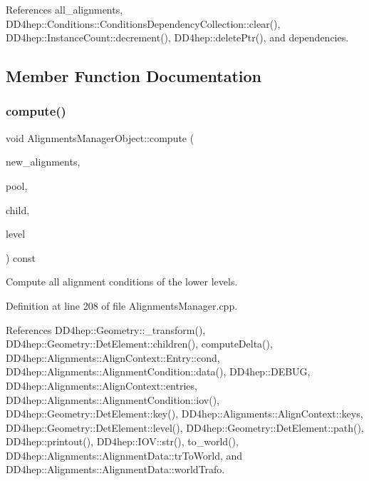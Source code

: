 References all\+\_\+alignments, D\+D4hep\+::\+Conditions\+::\+Conditions\+Dependency\+Collection\+::clear(), D\+D4hep\+::\+Instance\+Count\+::decrement(), D\+D4hep\+::delete\+Ptr(), and dependencies.



\subsection{Member Function Documentation}
\hypertarget{class_d_d4hep_1_1_alignments_1_1_alignments_manager_object_a91c9cba53d1965f76ab51b1449863225}{}\label{class_d_d4hep_1_1_alignments_1_1_alignments_manager_object_a91c9cba53d1965f76ab51b1449863225} 
\subsubsection{\texorpdfstring{compute()}{compute()}\hspace{0.1cm}{\footnotesize\ttfamily [1/3]}}
{\footnotesize\ttfamily void Alignments\+Manager\+Object\+::compute (\begin{DoxyParamCaption}\item[{\hyperlink{class_d_d4hep_1_1_alignments_1_1_align_context}{Align\+Context} \&}]{new\+\_\+alignments,  }\item[{\hyperlink{class_d_d4hep_1_1_conditions_1_1_user_pool}{User\+Pool} \&}]{pool,  }\item[{\hyperlink{class_d_d4hep_1_1_geometry_1_1_det_element}{Det\+Element}}]{child,  }\item[{int}]{level }\end{DoxyParamCaption}) const\hspace{0.3cm}{\ttfamily [protected]}}



Compute all alignment conditions of the lower levels. 



Definition at line 208 of file Alignments\+Manager.\+cpp.



References D\+D4hep\+::\+Geometry\+::\+\_\+transform(), D\+D4hep\+::\+Geometry\+::\+Det\+Element\+::children(), compute\+Delta(), D\+D4hep\+::\+Alignments\+::\+Align\+Context\+::\+Entry\+::cond, D\+D4hep\+::\+Alignments\+::\+Alignment\+Condition\+::data(), D\+D4hep\+::\+D\+E\+B\+UG, D\+D4hep\+::\+Alignments\+::\+Align\+Context\+::entries, D\+D4hep\+::\+Alignments\+::\+Alignment\+Condition\+::iov(), D\+D4hep\+::\+Geometry\+::\+Det\+Element\+::key(), D\+D4hep\+::\+Alignments\+::\+Align\+Context\+::keys, D\+D4hep\+::\+Geometry\+::\+Det\+Element\+::level(), D\+D4hep\+::\+Geometry\+::\+Det\+Element\+::path(), D\+D4hep\+::printout(), D\+D4hep\+::\+I\+O\+V\+::str(), to\+\_\+world(), D\+D4hep\+::\+Alignments\+::\+Alignment\+Data\+::tr\+To\+World, and D\+D4hep\+::\+Alignments\+::\+Alignment\+Data\+::world\+Trafo.



